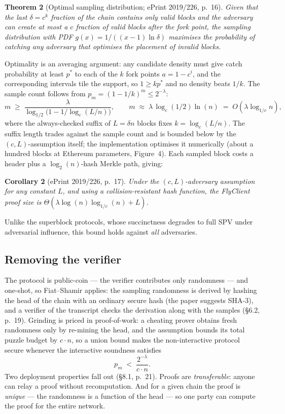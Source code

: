 \documentclass[11pt,a4paper]{article}
\theoremstyle{definition}
\begin{document}
\medskip
\noindent\textbf{Theorem 2} (Optimal sampling distribution; ePrint
2019/226, p.~16). \emph{Given that the last $\delta = c^k$ fraction of
the chain contains only valid blocks and the adversary can create at most
a $c$ fraction of valid blocks after the fork point, the sampling
distribution with PDF $g(x) = 1/((x-1)\ln\delta)$ maximises the
probability of catching any adversary that optimises the placement of
invalid blocks.}
\medskip

Optimality is an averaging argument: any candidate density must give
catch probability at least $p^*$ to each of the $k$ fork points
$a = 1 - c^i$, and the corresponding intervals tile the support, so
$1 \ge k p^*$ and no density beats $1/k$. The sample count follows from
$p_m = (1 - 1/k)^m \le 2^{-\lambda}$:
\[
m \;\ge\; \frac{\lambda}{\log_{1/2}\!\bigl(1 - 1/\log_c(L/n)\bigr)},
\qquad
m \;\approx\; \lambda \, \log_c(1/2) \ln(n) \;=\; O(\lambda \log_{1/c} n),
\]
where the always-checked suffix of $L = \delta n$ blocks fixes
$k = \log_c(L/n)$. The suffix length trades against the sample count and
is bounded below by the $(c, L)$-assumption itself; the implementation
optimises it numerically (about a hundred blocks at Ethereum parameters,
Figure~4). Each sampled block costs a header plus a $\log_2(n)$-hash
Merkle path, giving:

\medskip
\noindent\textbf{Corollary 2} (ePrint 2019/226, p.~17). \emph{Under the
$(c, L)$-adversary assumption for any constant $L$, and using a
collision-resistant hash function, the FlyClient proof size is
$\Theta(\lambda \log(n) \log_{1/c}(n) + L)$.}
\medskip

Unlike the superblock protocols, whose succinctness degrades to full SPV
under adversarial influence, this bound holds against \emph{all}
adversaries.

\subsection{Removing the verifier}\label{sec:fc-fs}

The protocol is public-coin --- the verifier contributes only randomness
--- and one-shot, so Fiat--Shamir applies: the sampling randomness is
derived by hashing the head of the chain with an ordinary secure hash
(the paper suggests SHA-3), and a verifier of the transcript checks the
derivation along with the samples (\S6.2, p.~19). Grinding is priced in
proof-of-work: a cheating prover obtains fresh randomness only by
re-mining the head, and the assumption bounds its total puzzle budget by
$c \cdot n$, so a union bound makes the non-interactive protocol secure
whenever the interactive soundness satisfies
\[
p_m \;<\; \frac{2^{-\lambda}}{c \cdot n}.
\]
Two deployment properties fall out (\S8.1, p.~21). Proofs are
\emph{transferable}: anyone can relay a proof without recomputation. And
for a given chain the proof is \emph{unique} --- the randomness is a
function of the head --- so one party can compute the proof for the
entire network.
\end{document}
